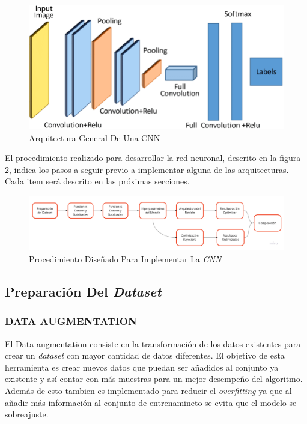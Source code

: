 	\begin{figure}[ht]
		\centering
		\includegraphics[scale=0.25]{Figs/A-generic-CNN-Architecture.png}
		\caption{Arquitectura General De Una CNN}
		\label{fig:cnnarchitecture}
	\end{figure}	
	
	El procedimiento realizado para desarrollar la red neuronal, descrito en la figura \ref{fig:procedimiento}, indica los pasos a seguir previo a implementar alguna de las arquitecturas. Cada item será descrito en las próximas secciones.  


	\begin{figure}[ht]
		\centering
		\includegraphics[scale=0.2]{Figs/procedimiento.jpg}
		\caption{Procedimiento Diseñado Para Implementar La \textit{CNN}}
		\label{fig:procedimiento}
	\end{figure}	


		\newpage
		\subsection{Preparación Del \textit{Dataset}}
			\subsubsection{DATA AUGMENTATION}

			El Data augmentation consiste en la transformación de los datos existentes para crear un \textit{dataset} con mayor cantidad de datos diferentes. El objetivo de esta herramienta es crear nuevos datos que puedan ser añadidos al conjunto ya existente y así contar con más muestras para un mejor desempeño del algoritmo. Además de esto tambien es implementado para reducir el \textit{overfitting} ya que al añadir más información al conjunto de entrenamineto se evita que el modelo se sobreajuste. \\


